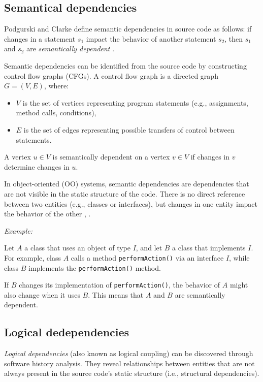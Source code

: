 \subsection{Semantical dependencies}

\hspace{4em} Podgurski and Clarke define semantic dependencies in source code as follows: if changes in a statement \(s_1\) impact the behavior of another statement \(s_2\), then \(s_1\) and \(s_2\) are \emph{semantically dependent} \cite{Podgurski-semantic}.

Semantic dependencies can be identified from the source code by constructing control flow graphs (CFGs). A control flow graph is a directed graph \(G = (V, E)\), where:
\begin{itemize}
    \item \(V\) is the set of vertices representing program statements (e.g., assignments, method calls, conditions),
    \item \(E\) is the set of edges representing possible transfers of control between statements.
\end{itemize}

A vertex \(u \in V\) is semantically dependent on a vertex \(v \in V\) if changes in \(v\) determine changes in \(u\).

In object-oriented (OO) systems, semantic dependencies are dependencies that are not visible in the static structure of the code. There is no direct reference between two entities (e.g., classes or interfaces), but changes in one entity impact the behavior of the other \cite{Neto-semantic-dep}, \cite{Capiluppi-semantic-dep}.


\textit{Example:}

Let \(A\) a class that uses an object of type \(I\), and let \(B\) a class that implements \(I\). For example, class \(A\) calls a method \texttt{performAction()} via an interface \(I\), while class \(B\) implements the \texttt{performAction()} method.

If \(B\) changes its implementation of \texttt{performAction()}, the behavior of \(A\) might also change when it uses \(B\). This means that \(A\) and \(B\) are semantically dependent.






\subsection{Logical dedependencies}
\hspace{4em} \textit{Logical dependencies} (also known as logical coupling) can be discovered through software history analysis. They reveal relationships between entities that are not always present in the source code's static structure (i.e., structural dependencies).

